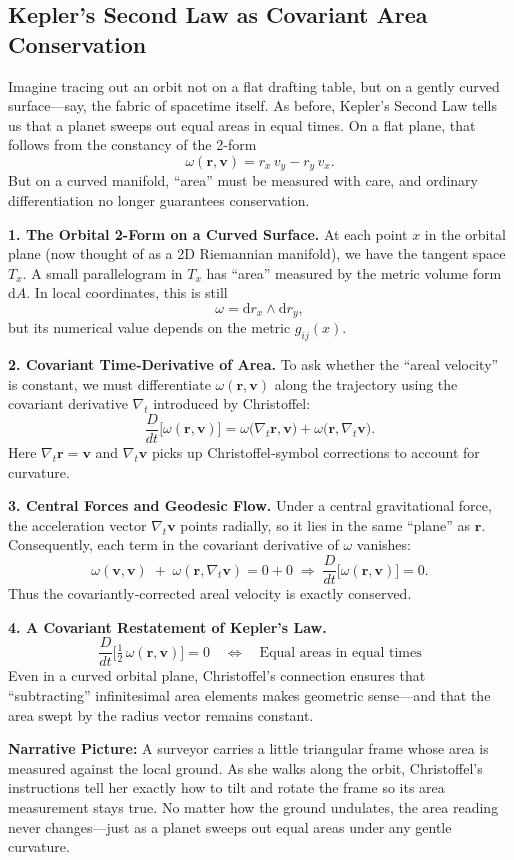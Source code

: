 \subsection{Kepler’s Second Law as Covariant Area Conservation}

Imagine tracing out an orbit not on a flat drafting table, but on a gently curved surface—say, the fabric of spacetime itself.  As before, Kepler’s Second Law tells us that a planet sweeps out equal areas in equal times.  On a flat plane, that follows from the constancy of the 2-form
\[
\omega(\mathbf r,\mathbf v)
= r_x\,v_y - r_y\,v_x.
\]
But on a curved manifold, “area” must be measured with care, and ordinary differentiation no longer guarantees conservation.  

\medskip
\noindent\textbf{1. The Orbital 2-Form on a Curved Surface.}  
At each point \(x\) in the orbital plane (now thought of as a 2D Riemannian manifold), we have the tangent space \(T_x\).  A small parallelogram in \(T_x\) has “area” measured by the metric volume form \(\mathrm{d}A\).  In local coordinates, this is still
\[
\omega = \mathrm{d}r_x\wedge \mathrm{d}r_y,
\]
but its numerical value depends on the metric \(g_{ij}(x)\).

\medskip
\noindent\textbf{2. Covariant Time‐Derivative of Area.}  
To ask whether the “areal velocity” is constant, we must differentiate \(\omega(\mathbf r,\mathbf v)\) along the trajectory using the covariant derivative \(\nabla_t\) introduced by Christoffel:
\[
\frac{D}{dt}\bigl[\omega(\mathbf r,\mathbf v)\bigr]
= \omega\bigl(\nabla_t\mathbf r,\mathbf v\bigr)
+\omega\bigl(\mathbf r,\nabla_t\mathbf v\bigr).
\]
Here \(\nabla_t\mathbf r=\mathbf v\) and \(\nabla_t\mathbf v\) picks up Christoffel‐symbol corrections to account for curvature.

\medskip
\noindent\textbf{3. Central Forces and Geodesic Flow.}  
Under a central gravitational force, the acceleration vector \(\nabla_t\mathbf v\) points radially, so it lies in the same “plane” as \(\mathbf r\).  Consequently, each term in the covariant derivative of \(\omega\) vanishes:
\[
\omega(\mathbf v,\mathbf v) \;+\;\omega(\mathbf r,\nabla_t\mathbf v)
= 0 + 0
\;\Longrightarrow\;
\frac{D}{dt}\bigl[\omega(\mathbf r,\mathbf v)\bigr] = 0.
\]
Thus the covariantly‐corrected areal velocity is exactly conserved.

\medskip
\noindent\textbf{4. A Covariant Restatement of Kepler’s Law.}  
\[
\boxed{
\frac{D}{dt}\!\bigl[\tfrac12\,\omega(\mathbf r,\mathbf v)\bigr] = 0
}
\quad\Longleftrightarrow\quad
\text{Equal areas in equal times}
\]
Even in a curved orbital plane, Christoffel’s connection ensures that “subtracting” infinitesimal area elements makes geometric sense—and that the area swept by the radius vector remains constant.

\medskip
\noindent\textbf{Narrative Picture:}  
A surveyor carries a little triangular frame whose area is measured against the local ground.  As she walks along the orbit, Christoffel’s instructions tell her exactly how to tilt and rotate the frame so its area measurement stays true.  No matter how the ground undulates, the area reading never changes—just as a planet sweeps out equal areas under any gentle curvature.  
